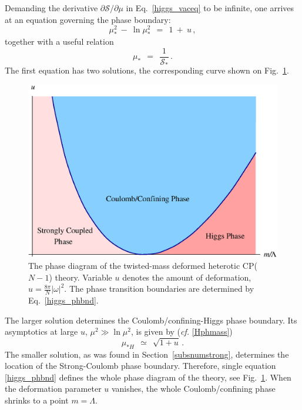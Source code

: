 \documentclass[epsfig,12pt]{article}
\def\beq{\begin{equation}}
\def\eeq{\end{equation}}
\newcommand{\cs}{{\mathcal S}}
\def\beq{\begin{equation}}
\def\eeq{\end{equation}}
\newcommand{\p}{\partial}
\begin{document}
{Demanding the derivative $ \p\cs/\p\mu $ in Eq.~\eqref{higgs_vaceq} to be infinite, 
one arrives at an equation governing the phase boundary:
\beq
\label{higgs_phbnd}
	\mu_*^2 ~-~ \ln \mu_*^2 ~~=~~ 1 ~+~ u\,,
\eeq
together with a useful relation
\beq
\label{higgs_cs}
	\mu_* ~~=~~ \frac{1}{\cs_*}\,.
\eeq
The first equation has two solutions, the corresponding curve shown on Fig.~\ref{fig:higgsborder}.
\begin{figure}
\epsfxsize=11cm
\centerline{\includegraphics[width=11.5cm,keepaspectratio]{phase_diag.eps}}
\caption{\small 
The phase diagram of the twisted-mass deformed heterotic CP($N-1$) theory.
Variable $u$ denotes the amount of deformation, $ u = \frac{8\pi}{N} |\omega|^2 $.
The phase transition boundaries are determined by Eq.~\eqref{higgs_phbnd}.
}
\label{fig:higgsborder}
\end{figure}
The larger solution determines the Coulomb/confining-Higgs phase boundary. Its asymptotics at large $u$,
$ \mu^2 \gg \ln \mu^2 $, is given by ({\it cf.} \eqref{Hphmass})
\beq
	\mu_{*H} ~~\simeq~~ \sqrt{ 1 + u }\,.
\eeq
The smaller solution, as was found in Section~\ref{subsnumstrong}, determines the location of the 
Strong-Coulomb phase boundary. 
Therefore, single equation \eqref{higgs_phbnd} defines the whole phase diagram
of the theory, see Fig.~\ref{fig:higgsborder}. 
When the deformation parameter $ u $ vanishes, the whole Coulomb/confining phase shrinks to a point
$ m = \Lambda $.

}
\end{document}
